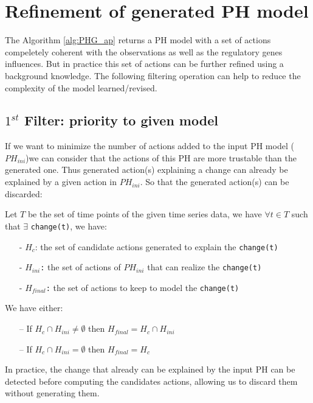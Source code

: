 \section{Refinement of generated PH model }
The Algorithm \ref{alg:PHG_ap} returns a PH model with a set of actions compeletely coherent with the observations as well as the regulatory genes influences.
But in practice this set of actions can be further refined using a background knowledge.
The following filtering operation can help to reduce the complexity of the model learned/revised.

\subsection{$1^{st}$ Filter: priority to given model}

If we want to minimize the number of actions added to the input PH  model ($PH_{ini}$)we can consider that the actions of this PH are more trustable than the generated one. Thus generated action(s) explaining a change can already be explained by a given action in $PH_{ini}$. So that the generated action(s) can be discarded:\\
\begin{definition}
Let $T$ be the set of time points of the given time series data, we have $\forall t \in T$ such that $\exists$  \texttt{change(t)}, we have:
\begin{itemize}
\item[-] \texttt{$H_c$}: the set of candidate actions generated to explain the \texttt{change(t)}
\item[-] \texttt{$H_{ini}$:} the set of actions of $PH_{ini}$ that can realize the \texttt{change(t)}
\item[-] \texttt{$H_{final}$:} the set of actions to keep to model the \texttt{change(t)}
\end{itemize}
We have either:
\begin{itemize}
\item[--] If $H_c \cap H_{ini} \neq \emptyset $ then $H_{final}= H_c \cap H_{ini}$ 
\item[--] If $H_c \cap H_{ini} = \emptyset $ then $H_{final}=H_c$
\end{itemize}
\end{definition}
In practice, the change that already can be explained by the input PH can be detected before computing the candidates actions, allowing us to discard them without generating them.

